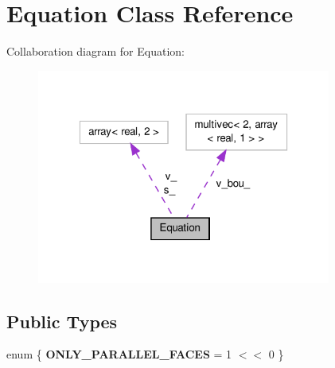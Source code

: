 \hypertarget{classEquation}{\section{Equation Class Reference}
\label{classEquation}
}


Collaboration diagram for Equation\-:
\nopagebreak
\begin{figure}[H]
\begin{center}
\leavevmode
\includegraphics[width=274pt]{classEquation__coll__graph}
\end{center}
\end{figure}
\subsection*{Public Types}
\begin{DoxyCompactItemize}
\item 
enum \{ {\bfseries O\-N\-L\-Y\-\_\-\-P\-A\-R\-A\-L\-L\-E\-L\-\_\-\-F\-A\-C\-E\-S} =  1 $<$$<$ 0
 \}
\end{DoxyCompactItemize}
